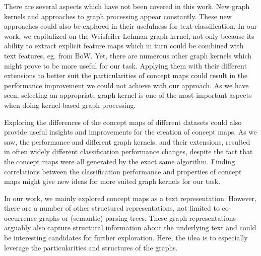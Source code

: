 
There are several aspects which have not been covered in this work.
New graph kernels and approaches to graph processing appear constantly. These new approaches could also be explored in their usefulness for text-classification.
In our work, we capitalized on the Weisfeiler-Lehman graph kernel, not only because its ability to extract explicit feature maps which in turn could be combined with text features, eg. from BoW.
Yet, there are numerous other graph kernels which might prove to be more useful for our task.
Applying them with their different extensions to better suit the particularities of concept maps could result in the performance improvement we could not achieve with our approach.
As we have seen, selecting an appropriate graph kernel is one of the most important aspects when doing kernel-based graph processing.

Exploring the differences of the concept maps of different datasets could also provide useful insights and improvements for the creation of concept maps.
As we saw, the performance and different graph kernels, and their extensions, resulted in often widely different classification performance changes, despite the fact that the concept maps were all generated by the exact same algorithm.
Finding correlations between the classification performance and properties of concept maps might give new ideas for more suited graph kernels for our task.

In our work, we mainly explored concept maps as a text representation. However, there are a number of other structured representations, not limited to co-occurrence graphs or (semantic) parsing trees.
These graph representations arguably also capture structural information about the underlying text and could be interesting candidates for further exploration.
Here, the idea is to especially leverage the particularities and structures of the graphs.

